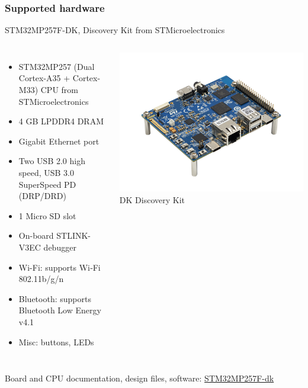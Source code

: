 \begin{frame}
\frametitle{Supported hardware}
  STM32MP257F-DK, Discovery Kit from STMicroelectronics
  \footnotesize
  \begin{columns}
    \begin{itemize}
    \item STM32MP257 (Dual Cortex-A35 + Cortex-M33) CPU from STMicroelectronics
    \item 4 GB LPDDR4 DRAM
    \item Gigabit Ethernet port
    \item Two USB 2.0 high speed, USB 3.0 SuperSpeed PD (DRP/DRD)
    \item 1 Micro SD slot
    \item On-board STLINK-V3EC debugger
    \item Wi-Fi: supports Wi‑Fi 802.11b/g/n
    \item Bluetooth: supports Bluetooth Low Energy v4.1
    \item Misc: buttons, LEDs
    \end{itemize}
    \begin{center}
    \includegraphics[width=\textwidth]{slides/discovery-board-stm32mp2/STM32MP257F-DK.png}\\
    DK Discovery Kit
    \end{center}
  \end{columns}
  \vspace{0.5em}
  Board and CPU documentation, design files, software:
  \href{https://www.st.com/en/evaluation-tools/stm32mp257f-dk.html}{STM32MP257F-dk}
\end{frame}
